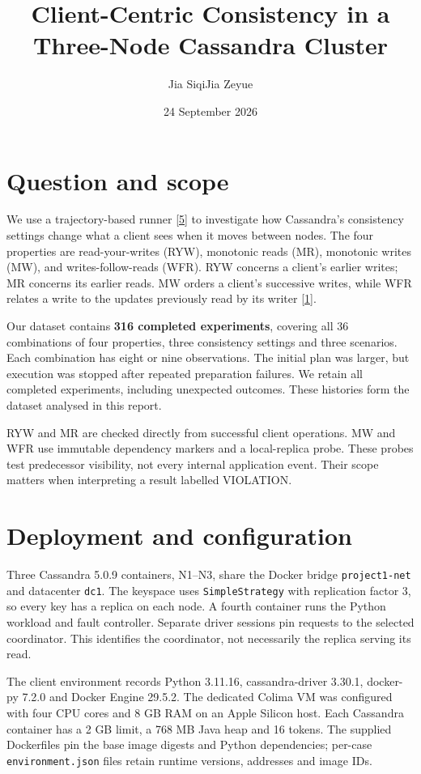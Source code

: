 \documentclass[lang=en,11pt,a4paper,bibend=bibtex]{elegantpaper}
\title{Client-Centric Consistency in a\\Three-Node Cassandra Cluster}
\author{Jia Siqi\qquad Jia Zeyue}
\institute{DSA5208 Project 1, National University of Singapore}
\date{24 September 2026}
\begin{document}
\maketitle
\vspace{0.3em}

\section{Question and scope}
We use a trajectory-based runner \hyperref[ref:5]{[5]} to investigate how Cassandra's consistency settings change what a client sees when it moves between nodes. The four properties are read-your-writes (RYW), monotonic reads (MR), monotonic writes (MW), and writes-follow-reads (WFR). RYW concerns a client's earlier writes; MR concerns its earlier reads. MW orders a client's successive writes, while WFR relates a write to the updates previously read by its writer \hyperref[ref:1]{[1]}.

Our dataset contains \textbf{316 completed experiments}, covering all 36 combinations of four properties, three consistency settings and three scenarios. Each combination has eight or nine observations. The initial plan was larger, but execution was stopped after repeated preparation failures. We retain all completed experiments, including unexpected outcomes. These histories form the dataset analysed in this report.

RYW and MR are checked directly from successful client operations. MW and WFR use immutable dependency markers and a local-replica probe. These probes test predecessor visibility, not every internal application event. Their scope matters when interpreting a result labelled VIOLATION.

\section{Deployment and configuration}
Three Cassandra 5.0.9 containers, N1--N3, share the Docker bridge \texttt{project1-net} and datacenter \texttt{dc1}. The keyspace uses \texttt{SimpleStrategy} with replication factor 3, so every key has a replica on each node. A fourth container runs the Python workload and fault controller. Separate driver sessions pin requests to the selected coordinator. This identifies the coordinator, not necessarily the replica serving its read.

The client environment records Python 3.11.16, cassandra-driver 3.30.1, docker-py 7.2.0 and Docker Engine 29.5.2. The dedicated Colima VM was configured with four CPU cores and 8 GB RAM on an Apple Silicon host. Each Cassandra container has a 2 GB limit, a 768 MB Java heap and 16 tokens. The supplied Dockerfiles pin the base image digests and Python dependencies; per-case \texttt{environment.json} files retain runtime versions, addresses and image IDs.
\end{document}

